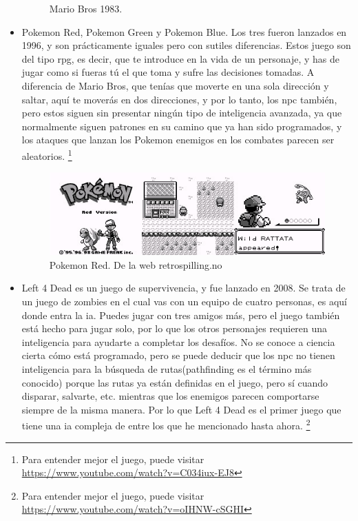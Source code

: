 \begin{itemize}
\begin{figure}[h]
		\caption{Mario Bros 1983.}
	\end{figure}
	\item Pokemon Red, Pokemon Green y Pokemon Blue. Los tres fueron lanzados en 1996, y son prácticamente iguales pero con sutiles diferencias. Estos juego son del tipo \gls{rpg}, es decir, que te introduce en la vida de un personaje, y has de jugar como si fueras tú el que toma y sufre las decisiones tomadas. A diferencia de Mario Bros, que tenías que moverte en una sola dirección y saltar, aquí te moverás en dos direcciones, y por lo tanto, los \gls{npc} también, pero estos siguen sin presentar ningún tipo de inteligencia avanzada, ya que normalmente siguen patrones en su camino que ya han sido programados, y los ataques que lanzan los Pokemon enemigos en los combates parecen ser aleatorios. \footnote{Para entender mejor el juego, puede visitar \url{https://www.youtube.com/watch?v=C034iux-EJ8}}
	\begin{figure}[h]
		\centering
		\includegraphics[width=15cm]{archivos/imagenes/pokemon-red.jpg}
		\caption{Pokemon Red. De la web retrospilling.no}
	\end{figure}
	\item Left 4 Dead es un juego de supervivencia, y fue lanzado en 2008. Se trata de un juego de zombies en el cual vas con un equipo de cuatro personas, es aquí donde entra la \gls{ia}. Puedes jugar con tres amigos más, pero el juego también está hecho para jugar solo, por lo que los otros personajes requieren una inteligencia para ayudarte a completar los desafíos. No se conoce a ciencia cierta cómo está programado, pero se puede deducir que los \gls{npc} no tienen inteligencia para la búsqueda de rutas(pathfinding es el término más conocido) porque las rutas ya están definidas en el juego, pero sí cuando disparar, salvarte, etc.  mientras que los enemigos parecen comportarse siempre de la misma manera. Por lo que Left 4 Dead es el primer juego que tiene una \gls{ia} compleja de entre los que he mencionado hasta ahora. \footnote{Para entender mejor el juego, puede visitar \url{https://www.youtube.com/watch?v=oIHNW-cSGHI}}
	\begin{figure}[h]

\end{figure}
\end{itemize}
